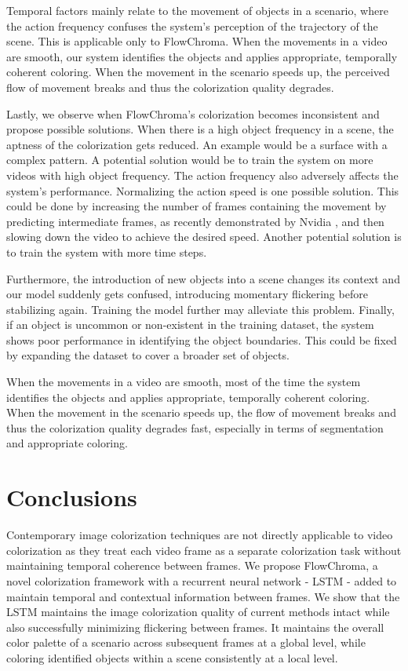 \documentclass[10pt,twocolumn,letterpaper]{article}
\begin{document}
Temporal factors mainly relate to the movement of objects in a scenario, where the action frequency confuses the system's perception of the trajectory of the scene. This is applicable only to FlowChroma. When the movements in a video are smooth, our system identifies the objects and applies appropriate, temporally coherent coloring. When the movement in the scenario speeds up, the perceived flow of movement breaks and thus the colorization quality degrades.

Lastly, we observe when FlowChroma's colorization becomes inconsistent and propose possible solutions. When there is a high object frequency in a scene, the aptness of the colorization gets reduced. An example would be a surface with a complex pattern. A potential solution would be to train the system on more videos with high object frequency. The action frequency also adversely affects the system's performance. Normalizing the action speed is one possible solution. This could be done by increasing the number of frames containing the movement by predicting intermediate frames, as recently demonstrated by Nvidia \cite{DBLP:journals/corr/abs-1712-00080}, and then slowing down the video to achieve the desired speed. Another potential solution is to train the system with more time steps.

Furthermore, the introduction of new objects into a scene changes its context and our model suddenly gets confused, introducing momentary flickering before stabilizing again. Training the model further may alleviate this problem. Finally, if an object is uncommon or non-existent in the training dataset, the system shows poor performance in identifying the object boundaries. This could be fixed by expanding the dataset to cover a broader set of objects.

When the movements in a video are smooth, most of the time the system identifies the objects and applies appropriate, temporally coherent coloring. When the movement in the scenario speeds up, the flow of movement breaks and thus the colorization quality degrades fast, especially in terms of segmentation and appropriate coloring.

\section{Conclusions}

Contemporary image colorization techniques are not directly applicable to video colorization as they treat each video frame as a separate colorization task without maintaining temporal coherence between frames. We propose FlowChroma, a novel colorization framework with a recurrent neural network - LSTM - added to maintain temporal and contextual information between frames. We show that the LSTM maintains the image colorization quality of current methods intact while also successfully minimizing flickering between frames. It maintains the overall color palette of a scenario across subsequent frames at a global level, while coloring identified objects within a scene consistently at a local level. 
\end{document}
